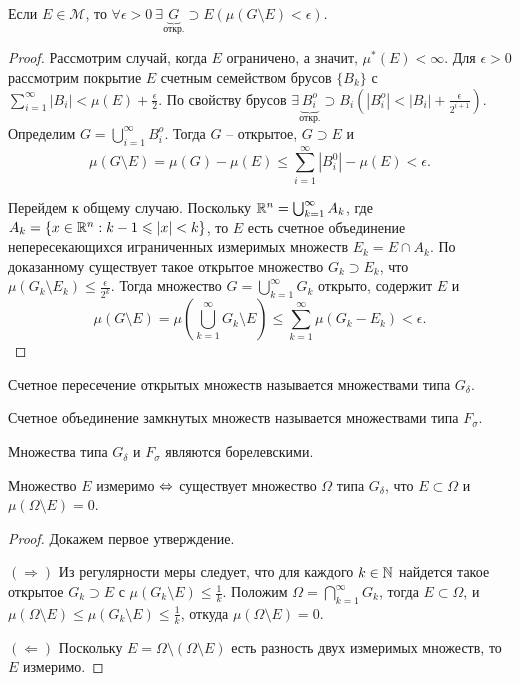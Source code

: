 \begin{lemma}
    Если $E \in \mathcal{M}$, то $\forall \epsilon > 0 \ \exists \underbrace{G}_{\text{откр.}} \supset E \left(\mu(G \setminus E) < \epsilon\right)$.
\end{lemma}

\begin{proof}
    Рассмотрим случай, когда $E$ ограничено, а значит, $\mu^{*}(E) < \infty$. Для $\epsilon > 0$ рассмотрим покрытие $E$ счетным семейством брусов $\{B_{k}\}$ с $\sum_{i = 1}^{\infty}|B_{i}| < \mu(E) + \frac{\epsilon}{2}$. По свойству брусов $\exists \underbrace{B_{i}^{o}}_{\text{откр.}} \supset B_{i}\left(|B_{i}^{o}| < |B_{i}| + \frac{\epsilon}{2^{i + 1}}\right)$. Определим $G = \bigcup_{i = 1}^{\infty} B_{i}^{o}$. Тогда $G$ -- открытое, $G \supset E$ и 
    \[\mu(G \setminus E) = \mu(G) - \mu(E) \leq \sum_{i = 1}^{\infty}|B_{i}^{0}| - \mu(E) < \epsilon.\]

    Перейдем к общему случаю. Поскольку $\mathbb{R}^{n} = \bigcup_{k = 1}^{\infty}A_{k}$, где $A_{k} = \{x \in \mathbb{R}^{n}: k - 1 \leqslant |x| < k\}$, то $E$ есть счетное объединение непересекающихся играниченных измеримых множеств $E_{k} = E \cap A_{k}$. По доказанному существует такое открытое множество $G_{k} \supset E_{k}$, что $\mu(G_{k} \setminus E_{k}) \leq \frac{\epsilon}{2^{k}}$. Тогда множество $G = \bigcup_{k = 1}^{\infty}G_{k}$ открыто, содержит $E$ и 
    \[\mu(G \setminus E) = \mu\left(\bigcup_{k = 1}^{\infty} G_{k} \setminus E\right) \leq \sum_{k = 1}^{\infty}\mu(G_{k} - E_{k}) < \epsilon.\]
\end{proof}

\begin{definition}
    Счетное пересечение открытых множеств называется множествами типа $G_{\delta}$.

    Счетное объединение замкнутых множеств называется множествами типа $F_{\sigma}$.
\end{definition}

\begin{note}
    Множества типа $G_{\delta}$ и $F_{\sigma}$ являются борелевскими.
\end{note}

\begin{theorem}
    Множество $E$ измеримо $\Leftrightarrow$ существует множество $\Omega$ типа $G_{\delta}$, что $E \subset \Omega$ и $\mu(\Omega \setminus E) = 0$.
\end{theorem}

\begin{proof}
    Докажем первое утверждение.

    $(\Rightarrow)$ Из регулярности меры следует, что для каждого $k \in \mathbb{N}$ найдется такое открытое $G_{k} \supset E$ с $\mu(G_{k} \setminus E) \leq \frac{1}{k}$. Положим $\Omega = \bigcap_{k=1}^{\infty}G_{k}$, тогда $E \subset \Omega$, и $\mu(\Omega \setminus E) \leq \mu(G_{k} \setminus E) \leq \frac{1}{k}$, откуда $\mu(\Omega \setminus E) = 0$.

    $(\Leftarrow)$ Поскольку $E = \Omega \setminus (\Omega \setminus E)$ есть разность двух измеримых множеств, то $E$ измеримо.
\end{proof}

